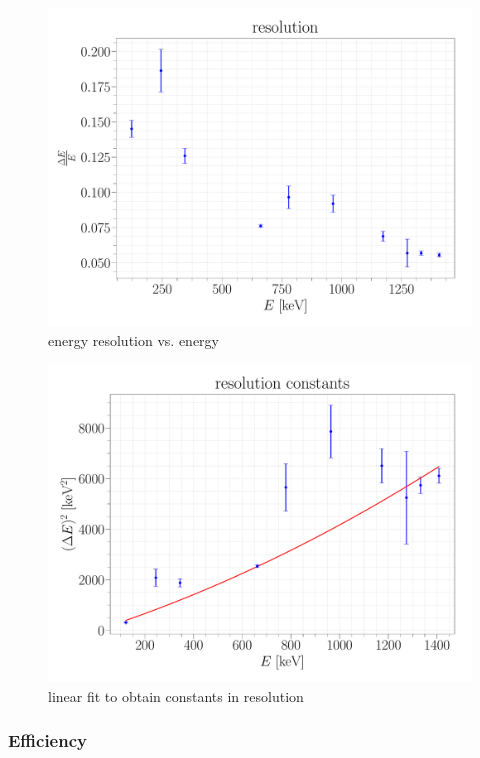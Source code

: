 \documentclass[a4paper,12pt]{article}
\begin{document}
\begin{figure}
\center
\includegraphics[scale=0.3]{../Figures/resolution.pdf}
\caption{energy resolution vs. energy}
\label{resolution}
\end{figure}
\newpage

\begin{figure}
\center
\includegraphics[scale=0.3]{../Figures/resolution constants.pdf}
\caption{linear fit to obtain constants in resolution}
\label{resolutionFit}
\end{figure}
\newpage

\subsubsection{Efficiency}
\end{document}
